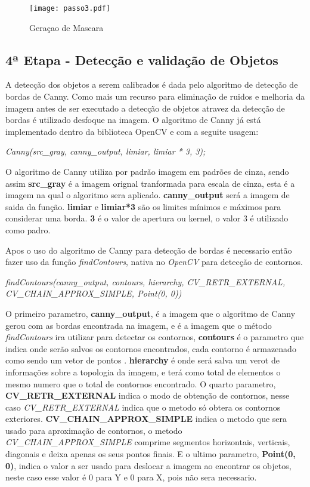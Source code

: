 \begin{figure}[H]
			\centering
			\texttt{[image: passo3.pdf]}
			\caption{Geraçao de Mascara}
			\label{Configuracao}
		\end{figure}		


\subsection{4ª Etapa - Detecção e validação de Objetos}
A detecção dos objetos a serem calibrados é dada pelo algoritmo de detecção de bordas de Canny. Como mais um recurso para eliminação de ruidos e melhoria da imagem antes de ser executado a detecção de objetos atravez da detecção de bordas é utilizado desfoque na imagem. O algoritmo de Canny já está implementado dentro da biblioteca OpenCV e com a seguite usagem:
\begin{center}
\centering \textit{  Canny(src\_gray, canny\_output, limiar, limiar * 3, 3);}
\end{center}
O algoritmo de Canny utiliza por padrão imagem em padrões de cinza, sendo assim \textbf{src\_gray} é a imagem orignal tranformada para escala de cinza, esta é a imagem na qual o algoritmo sera aplicado. \textbf{canny\_output} será a imagem de saida da função.
\textbf{limiar} e \textbf{limiar*3} são os limites mínimos e máximos para considerar uma borda. \textbf{3} é o valor de apertura ou kernel, o valor 3 é utilizado como padro.

Apos o uso do algoritmo de Canny para detecção de bordas é necessario então fazer uso da função \textit{findContours}, nativa no \textit{OpenCV} para detecção de contornos.
\begin{center}
\centering \textit{ findContours(canny\_output, contours, hierarchy, CV\_RETR\_EXTERNAL, CV\_CHAIN\_APPROX\_SIMPLE, Point(0, 0))}
\end{center}

O primeiro parametro, \textbf{canny\_output}, é a imagem que o algoritmo de Canny gerou com as bordas encontrada na imagem, e é a imagem que o método \textit{findContours} ira utilizar para detectar os contornos, \textbf{contours} é o parametro que indica onde serão salvos os contornos encontrados, cada contorno é armazenado como sendo um vetor de pontos \cite{OpenCV}. \textbf{hierarchy} é onde será salva um verot de informações sobre a topologia da imagem, e terá como total de elementos o mesmo numero que o total de contornos encontrado\cite{OpenCV}. O quarto parametro, \textbf{CV\_RETR\_EXTERNAL} indica o modo de obtenção de contornos, nesse caso \textit{CV\_RETR\_EXTERNAL} indica que o metodo só obtera os contornos exteriores\cite{OpenCV}. \textbf{CV\_CHAIN\_APPROX\_SIMPLE} indica o metodo que sera usado para aproximação de contornos, o metodo \textit{CV\_CHAIN\_APPROX\_SIMPLE} comprime segmentos horizontais, verticais, diagonais e deixa apenas os seus pontos finais\cite{OpenCV}. E o ultimo parametro, \textbf{Point(0, 0)}, indica o valor a ser usado para deslocar a imagem ao encontrar os objetos, neste caso esse valor é 0 para Y e 0 para X, pois não sera necessario. 


